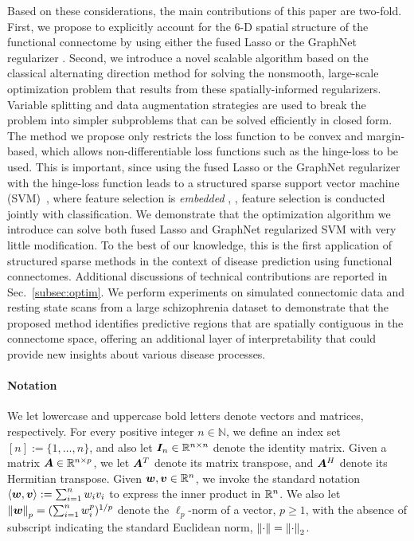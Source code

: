 Based on these considerations, the main contributions of this paper are two-fold.
First, we propose to explicitly account for the $6$-D spatial structure of the functional connectome by using either the fused Lasso \citep{Tibshirani:2005} or the GraphNet regularizer \citep{Grosenick:2013}.
Second, we introduce a novel scalable algorithm based on the classical alternating direction method \citep{Gabay:1976,Glowinski:1975,Boyd:2011} for solving the nonsmooth, large-scale optimization problem that results from these spatially-informed regularizers.
Variable splitting and data augmentation strategies are used to break the problem into simpler subproblems that can be solved efficiently in closed form.
The method we propose only restricts the loss function to be convex and margin-based, which allows non-differentiable loss functions such as the hinge-loss to be used.  This is important, since using the fused Lasso or the GraphNet regularizer with the hinge-loss function leads to a structured sparse support vector machine (SVM)~\citep{Grosenick:2013,Gui-Bo-Ye:2011}, where feature selection is \emph{embedded} \citep{Guyon:2003}, \ie, feature selection is conducted jointly with classification.
We demonstrate that the optimization algorithm we introduce can solve both fused Lasso and GraphNet regularized SVM with very little modification.
To the best of our knowledge, this is the first application of structured sparse methods in the context of disease prediction using functional connectomes.
Additional discussions of technical contributions are reported in Sec.~\ref{subsec:optim}.
We perform experiments on simulated connectomic data and resting state scans from a large schizophrenia dataset to demonstrate that the proposed method identifies predictive regions that are spatially contiguous in the connectome space, offering an additional layer of interpretability that could provide new insights about various disease processes.

\paragraph{Notation}
We let lowercase and uppercase bold letters denote vectors and matrices, respectively.  
For every positive integer $n\in\mathbb{N}$, we define an index set $[n]:=\{1,\dots,n\}$, and also let $\bm{I}_n\in\mathbb{R}^{n\times n}$ denote the identity matrix.
Given a matrix $\bm{A}\in\mathbb{R}^{n\times p}$, we let $\bm{A}^T$ denote its matrix transpose, and $\bm{A}^H$ denote its Hermitian transpose.
Given ${\bm{w}},\bm{v}\in\mathbb{R}^n$, we invoke the standard notation $\mathop{\langle {\ensuremath{\bm{w}}},\bm{v}\rangle}\nolimits:=\sum_{i=1}^n w_iv_i$ to express the inner product in $\mathbb{R}^n$.  
We also let $\left\| {\bm{w}} \right\|_p=(\sum_{i=1}^n w_i^p)^{1/p}$ denote the $\ell_p$-norm of a vector, $p\geq 1$, with the absence of subscript indicating the standard Euclidean norm, $\left\| \cdot \right\|=\left\| \cdot \right\|_2$.
